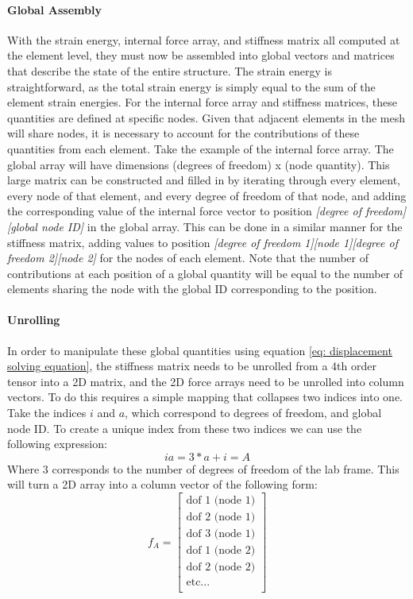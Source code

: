 \documentclass[]{spie}  %
\begin{document}
\paragraph{Global Assembly}
With the strain energy, internal force array, and stiffness matrix all computed at the element level, they must now be assembled into global vectors and matrices that describe the state of the entire structure. The strain energy is straightforward, as the total strain energy is simply equal to the sum of the element strain energies. For the internal force array and stiffness matrices, these quantities are defined at specific nodes. Given that adjacent elements in the mesh will share nodes, it is necessary to account for the contributions of these quantities from each element. Take the example of the internal force array. The global array will have dimensions (degrees of freedom) x (node quantity). This large matrix can be constructed and filled in by iterating through every element, every node of that element, and every degree of freedom of that node, and adding the corresponding value of the internal force vector to position \textit{[degree of freedom][global node ID]} in the global array. This can be done in a similar manner for the stiffness matrix, adding values to position \textit{[degree of freedom 1][node 1][degree of freedom 2][node 2]} for the nodes of each element. Note that the number of contributions at each position of a global quantity will be equal to the number of elements sharing the node with the global ID corresponding to the position.

\paragraph{Unrolling}
In order to manipulate these global quantities using equation \ref{eq: displacement solving equation}, the stiffness matrix needs to be unrolled from a 4th order tensor into a 2D matrix, and the 2D force arrays need to be unrolled into column vectors. To do this requires a simple mapping that collapses two indices into one. Take the indices $i$ and $a$, which correspond to degrees of freedom, and global node ID. To create a unique index from these two indices we can use the following expression:
\begin{equation}
\label{eq: unrolling}
ia = 3 * a + i = A
\end{equation}
Where 3 corresponds to the number of degrees of freedom of the lab frame. This will turn a 2D array into a column vector of the following form:
\begin{equation}
\label{eq: global force array}
f_A =
\begin{bmatrix}
	\textrm{dof 1 (node 1)}	 \\
	\textrm{dof 2 (node 1)}	 \\
	\textrm{dof 3 (node 1)}	\\
	\textrm{dof 1 (node 2)}	\\
	\textrm{dof 2 (node 2)}	\\
	\textrm{etc...}	\\
\end{bmatrix}
\end{equation}
\end{document}
